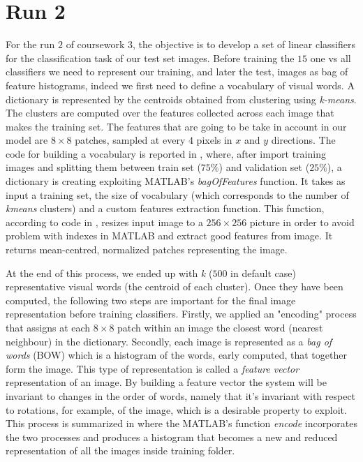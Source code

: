 \section{Run 2}

For the run $2$ of coursework $3$, the objective is to develop a set of linear classifiers for the classification task of our test set images. Before training the $15$ one vs all classifiers we need to represent our training, and later the test, images as bag of feature histograms, indeed we first need to define a vocabulary of visual words. A dictionary is represented by the centroids obtained from clustering using \textit{k-means}. The clusters are computed over the features collected across each image that makes the training set. The features that are going to be take in account in our model are $8\times 8$ patches, sampled at every $4$ pixels in $x$ and $y$ directions. The code for building a vocabulary is reported in , where, after import training images and splitting them between train set ($75\%$) and validation set ($25\%$), a dictionary is creating exploiting MATLAB's \textit{bagOfFeatures} function. It takes as input a training set, the size of vocabulary (which corresponds to the number of \textit{kmeans} clusters) and a custom features extraction function. This function, according to code in , resizes input image to a $256\times 256$ picture in order to avoid problem with indexes in MATLAB and extract good features from image. It returns mean-centred, normalized patches representing the image.

At the end of this process, we ended up with \textit{k} ($500$ in default case) representative visual words (the centroid of each cluster). Once they have been computed, the following two steps are important for the final image representation before training classifiers. Firstly, we applied an "encoding" process that assigns at each $8\times 8$ patch within an image the closest word (nearest neighbour) in the dictionary. Secondly, each image is represented as a \textit{bag of words} (BOW) which is a histogram of the words, early computed, that together form the image. This type of representation is called a \textit{feature vector} representation of an image. By building a feature vector the system will be invariant to changes in the order of words, namely that it's invariant with respect to rotations, for example, of the image, which is a desirable property to exploit. This process is summarized in  where the MATLAB's function \textit{encode} incorporates the two processes and produces a histogram that becomes a new and reduced representation of all the images inside training folder.

